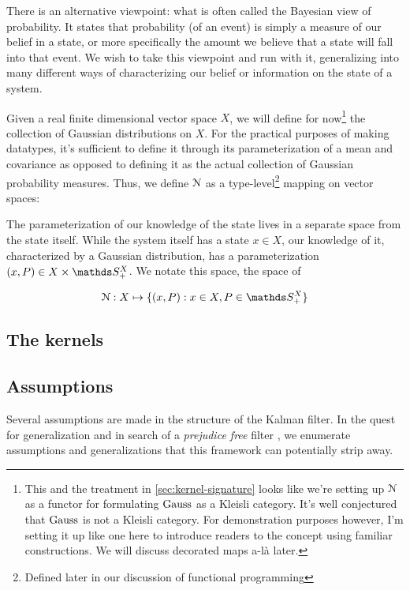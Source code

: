There is an alternative viewpoint: what is often called the Bayesian view of probability.
It states that probability (of an event) is simply a measure of our belief in a state, or more specifically the amount we believe that a state will fall into that event.
We wish to take this viewpoint and run with it, generalizing into many different ways of characterizing our belief or information on the state of a system.

Given a real finite dimensional vector space $X$, we will define for now\footnote{This and the treatment in \ref{sec:kernel-signature} looks like we're setting up $\mathcal{N}$ as a functor for formulating $\mathrm{Gauss}$ as a Kleisli category. It's well conjectured that $\mathrm{Gauss}$ is not a Kleisli category. For demonstration purposes however, I'm setting it up like one here to introduce readers to the concept using familiar constructions. We will discuss decorated maps a-l\`a \cite{stein2022extended} later.} the collection of Gaussian distributions on $X$.
For the practical purposes of making datatypes, it's sufficient to define it through its parameterization of a mean and covariance as opposed to defining it as the actual collection of Gaussian probability measures.
Thus, we define $\mathcal{N}$ as a type-level\footnote{Defined later in our discussion of functional programming} mapping on vector spaces:

The parameterization of our knowledge of the state lives in a separate space from the state itself.
While the system itself has a state $x\in X$, our knowledge of it, characterized by a Gaussian distribution, has a parameterization $(x,P)\in X\times \symmetric^X_+$.
We notate this space, the space of 


\begin{equation}
    \gaussian : X \mapsto \{(x,P) : x\in X, P \in \symmetric^X_+\}
\end{equation}

\subsection{The kernels}


\subsection{Assumptions}

Several assumptions are made in the structure of the Kalman filter. In the quest for generalization and in search of a \emph{prejudice free} filter \cite{some-moriba-paper}, we enumerate assumptions and generalizations that this framework can potentially strip away.

